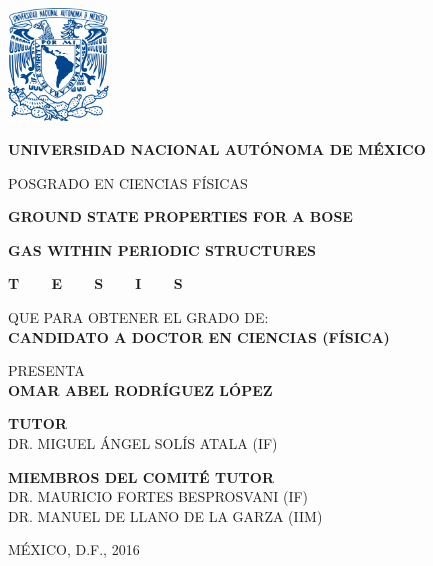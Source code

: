 

\thispagestyle{empty}

\vskip -2in
\vspace*{-1.5cm}
\begin{center}
	\includegraphics[height=3.0cm]{./figures/logo-unam}
\end{center}

\begin{center}
	{\Large \textbf{UNIVERSIDAD NACIONAL AUTÓNOMA DE MÉXICO}}

	{\Large POSGRADO EN CIENCIAS FÍSICAS}
	\vspace{1.5cm}

	{
		{\LARGE \textbf{GROUND STATE PROPERTIES FOR A BOSE}}

		\vspace*{0.1cm}

		{\LARGE \textbf{GAS WITHIN PERIODIC STRUCTURES}}
	}
	\vspace{1.5cm}

	{\Large
	{\LARGE \textbf{T\ \ \ \ E\ \ \ \ S\ \ \ \ I\ \ \ \ S}}

	QUE PARA OBTENER EL GRADO DE:
	\\[3pt]

	\textbf{CANDIDATO A DOCTOR EN CIENCIAS (FÍSICA)}

	\vspace{1cm}

	PRESENTA
	\\

	{\LARGE \textbf{OMAR ABEL RODRÍGUEZ LÓPEZ}}

	\vspace{1cm}

	\textbf{TUTOR}
	\\
	DR. MIGUEL ÁNGEL SOLÍS ATALA (IF)

	\vspace{1cm}

	\textbf{MIEMBROS DEL COMITÉ TUTOR}
	\\
	DR. MAURICIO FORTES BESPROSVANI (IF)
	\\
	DR. MANUEL DE LLANO DE LA GARZA (IIM)

	\vspace{1cm}
	MÉXICO, D.F., 2016
	}


\end{center}

\newpage

\thispagestyle{empty}
\begin{vplace}
	\centering
\end{vplace}
